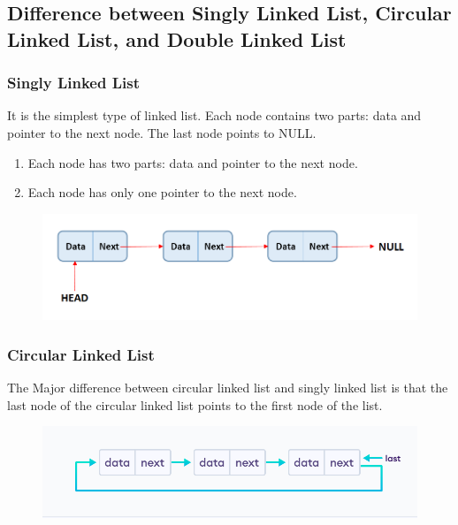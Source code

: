 \documentclass[11pt]{article}
\begin{document}
\subsection{Difference between Singly Linked List, Circular Linked List, and Double Linked List}

\subsubsection{Singly Linked List}

It is the simplest type of linked list. Each node contains two parts: data and pointer to the next node. The last node points to NULL.

\begin{enumerate}
	\item Each node has two parts: data and pointer to the next node.
	\item Each node has only one pointer to the next node.
\end{enumerate}

\begin{figure}[H]
	\begin{small}
		\begin{center}
			\includegraphics[scale=0.5]{linked-list.png}
		\end{center}
		\caption{}
		\label{fig:}
	\end{small}
\end{figure}


\subsubsection{Circular Linked List}

The Major difference between circular linked list and singly linked list is that the last node of the circular linked list points to the first node of the list.

\begin{figure}[H]
	\begin{small}
		\begin{center}
			\includegraphics[scale=0.5]{cll.png}
		\end{center}
		\caption{}
		\label{fig:}
	\end{small}
\end{figure}
\end{document}
